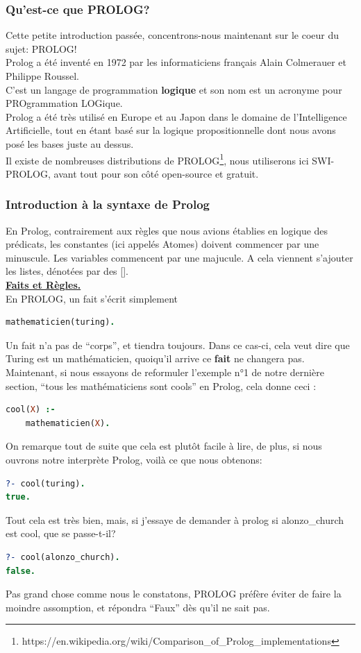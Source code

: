 \documentclass[a4paper, 12pt]{article}
\numberwithin{equation}{subsection}
\begin{document}
\subsubsection{Qu'est-ce que PROLOG?}
Cette petite introduction passée, concentrons-nous maintenant sur le coeur du sujet: PROLOG! \\

Prolog a été inventé en 1972 par les informaticiens français Alain Colmerauer et Philippe Roussel. \\
C'est un langage de programmation {\bf logique} et son nom est un acronyme pour PROgrammation LOGique. \\
Prolog a été très utilisé en Europe et au Japon dans le domaine de l'Intelligence Artificielle, tout en étant basé sur la logique propositionnelle dont nous avons posé les bases juste au dessus. \\
Il existe de nombreuses distributions de PROLOG\footnote{https://en.wikipedia.org/wiki/Comparison\_of\_Prolog\_implementations}, nous utiliserons ici SWI-PROLOG, avant tout pour son côté open-source et gratuit.
\subsubsection{Introduction à la syntaxe de Prolog}
En Prolog, contrairement aux règles que nous avions établies en logique des prédicats, les constantes (ici appelés Atomes) doivent commencer par une minuscule. Les variables commencent par une majucule. A cela viennent s'ajouter les listes, dénotées par des []. \\

\underline{{\bf Faits et Règles.}} \\[0.2cm]
En PROLOG, un fait s'écrit simplement \
\begin{lstlisting}[language=Prolog]
mathematicien(turing).
\end{lstlisting}
Un fait n'a pas de ``corps'', et tiendra toujours. Dans ce cas-ci, cela veut dire que Turing est un mathématicien, quoiqu'il arrive ce {\bf fait} ne changera pas. \\
Maintenant, si nous essayons de reformuler l'exemple n°1 de notre dernière section, ``tous les mathématiciens sont cools'' en Prolog, cela donne ceci :
\begin{lstlisting}[language=Prolog]
cool(X) :-
    mathematicien(X).
\end{lstlisting}
On remarque tout de suite que cela est plutôt facile à lire, de plus, si nous ouvrons notre interprète Prolog, voilà ce que nous obtenons:
\begin{lstlisting}[language=Prolog]
?- cool(turing).
true.
\end{lstlisting}
Tout cela est très bien, mais, si j'essaye de demander à prolog si alonzo\_church est cool, que se passe-t-il?
\begin{lstlisting}[language=Prolog]
?- cool(alonzo_church).
false.
\end{lstlisting}
Pas grand chose comme nous le constatons, PROLOG préfère éviter de faire la moindre assomption, et répondra ``Faux'' dès qu'il ne sait pas.
\end{document}
